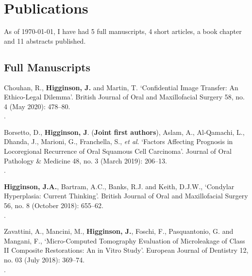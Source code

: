 \section*{Publications}


As of \today, I have had 5 full manuscripts, 4 short articles, a book chapter and 11 abstracts published.

\subsection*{Full Manuscripts}

 Chouhan, R., \textbf{Higginson, J.} and Martin, T. `Confidential Image Transfer: An Ethico-Legal Dilemma’. British Journal of Oral and Maxillofacial Surgery 58, no. 4 (May 2020): 478–80. 
\\.

\vspace{0.1cm}

 Borsetto, D., \textbf{Higginson, J}. (\textbf{Joint first authors}), Aslam, A., Al‐Qamachi, L., Dhanda, J., Marioni, G., Franchella, S., \textit{et al}. `Factors Affecting Prognosis in Locoregional Recurrence of Oral Squamous Cell Carcinoma’. Journal of Oral Pathology \& Medicine 48, no. 3 (March 2019): 206–13.
\\.

\vspace{0.1cm}

 \textbf{Higginson, J.A.}, Bartram, A.C., Banks, R.J. and Keith, D.J.W., `Condylar Hyperplasia: Current Thinking’. British Journal of Oral and Maxillofacial Surgery 56, no. 8 (October 2018): 655–62. 
\\.

\vspace{0.1cm}

 Zavattini, A., Mancini, M., \textbf{Higginson, J.}, Foschi, F., Pasquantonio, G. and Mangani, F., `Micro-Computed Tomography Evaluation of Microleakage of Class II Composite Restorations: An in Vitro Study’. European Journal of Dentistry 12, no. 03 (July 2018): 369–74. 
\\.

\vspace{0.1cm}


